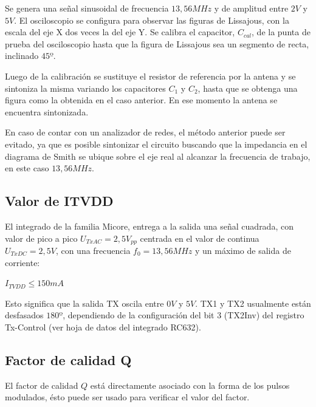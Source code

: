 \bigskip
\begin{itshape}
\end{itshape}

Se genera una señal sinusoidal de frecuencia $13,56 MHz$ y de amplitud entre $2V$ y $5V$.
El osciloscopio se configura para observar las figuras de Lissajous, con la escala del eje X dos veces la del eje Y.
Se calibra el capacitor, $C_{cal}$, de la punta de prueba del osciloscopio hasta que la figura de Lissajous sea un segmento de recta, inclinado $45º$.

\bigskip
\begin{itshape}
\end{itshape}

Luego de la calibración se sustituye el resistor de referencia por la antena y se sintoniza la misma variando los capacitores $C_{1}$ y $C_{2}$, hasta que se obtenga una figura como la obtenida en el caso anterior. En ese momento la antena se encuentra sintonizada.


En caso de contar con un analizador de redes, el método anterior puede ser evitado, ya que es posible sintonizar el circuito buscando que la impedancia en el diagrama de Smith se ubique sobre el eje real al alcanzar la frecuencia de trabajo, en este caso $13,56 MHz$.


\subsection{Valor de ITVDD}

El integrado de la familia Micore, entrega a la salida una señal cuadrada, con valor de pico a pico $U_{TxAC} = 2,5V_{pp}$ centrada en el valor de continua  $U_{TxDC} = 2,5V$, con una frecuencia $f_{0} = 13,56 MHz$ y un máximo de salida de corriente: 


\centerline{$I_{TVDD} \leq 150mA$}


Esto significa que la salida TX oscila entre $0V$ y $5V$. TX1 y TX2 usualmente están desfasados $180º$, dependiendo de la configuración del bit 3 (TX2Inv) del registro Tx-Control (ver hoja de datos del integrado RC632).


\subsection{Factor de calidad Q}

El factor de calidad $Q$ está directamente asociado con la forma de los pulsos modulados, ésto puede ser usado para verificar el valor del factor.

